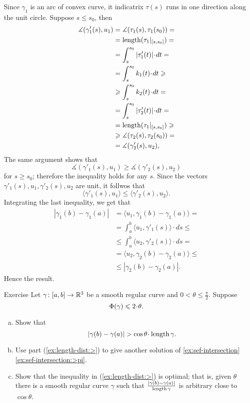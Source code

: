Since $\gamma_1$ is an arc of convex curve, it indicatrix $\tau(s)$ runs in one direction along the unit circle.
Suppose $s\le s_0$, then 
\begin{align*}
\measuredangle(\gamma'_1(s),u_1)&=\measuredangle(\tau_1(s),\tau_1(s_0))=
\\
&=\length (\tau_1|_{[s,s_0]})=
\\
&=\int_s^{s_0}|\tau_1'(t)|\cdot d t=
\\
&=\int_s^{s_0}\kur_1(t)\cdot d t\ge
\\
&\ge
\int_s^{s_0}\kur_2(t)\cdot d t=
\\
&=\int_s^{s_0}|\tau_2'(t)|\cdot d t= 
\\
&=\length (\tau_1|_{[s,s_0]})\ge
\\
&\ge \measuredangle(\tau_2(s),\tau_2(s_0))=
\\
&= \measuredangle(\gamma'_2(s),u_2),
\end{align*}
The same argument shows that 
\[\measuredangle(\gamma'_1(s),u_1)\ge \measuredangle(\gamma'_2(s),u_2)\]
for $s\ge s_0$; therefore the inequality holds for any $s$. 
Since the vectors $\gamma'_1(s),u_1,\gamma'_2(s),u_2$ are unit, it follwos that 
\[\langle\gamma'_1(s),u_1\rangle\le \langle\gamma'_2(s),u_2\rangle.\]
Integrating the last inequality, we get that 
\begin{align*}
|\gamma_1(b)-\gamma_1(a)|&=\langle u_1,\gamma_1(b)-\gamma_1(a)\rangle=
\\
&=\int_a^b\langle u_1,\gamma'_1(s)\rangle\cdot ds \le 
\\
&\le\int_a^b\langle u_2,\gamma'_2(s)\rangle\cdot ds =
\\
&=\langle u_2,\gamma_2(b)-\gamma_2(a)\rangle \le
\\
&\le |\gamma_2(b)-\gamma_2(a)|.
\end{align*}
Hence the result.\qeds

\begin{thm}{Exercise}\label{ex:length-dist}
Let $\gamma\colon[a,b]\to \mathbb{R}^3$ be a smooth regular curve and $0<\theta\le\tfrac\pi2$.
Suppose 
\[\tc\gamma\le 2\cdot\theta.\]
\begin{enumerate}[(a)]
\item\label{ex:length-dist:>} Show that 
\[|\gamma(b)-\gamma(a)|> \cos\theta\cdot\length\gamma.\]
\item Use part (\ref{ex:length-dist:>}) to give another solution of \ref{ex:sef-intersection}\ref{ex:sef-intersection:>pi}.
\item Show that the inequality in (\ref{ex:length-dist:>}) is optimal; that is, given 
$\theta$ there is a smooth regular curve $\gamma$ such that $\frac{|\gamma(b)-\gamma(a)|}{\mathop{\rm length}\nolimits\gamma}$ is arbitrary close to $\cos\theta$.

\end{enumerate}

\end{thm}

